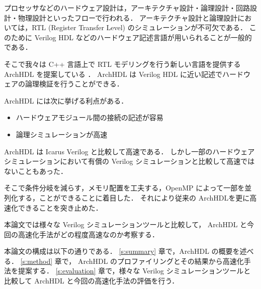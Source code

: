 プロセッサなどのハードウェア設計は，アーキテクチャ設計・論理設計・回路設計・物理設計といったフローで行われる．
アーキテクチャ設計と論理設計においては，RTL (Register Transfer Level) のシミュレーションが不可欠である．
このために Verilog HDL などのハードウェア記述言語が用いられることが一般的である．

そこで我々は C++ 言語上で RTL モデリングを行う新しい言語を提供する
ArchHDL を提案している \cite{satos:archhdl}． ArchHDL は Verilog HDL
に近い記述でハードウェアの論理検証を行うことができる．

ArchHDL には次に挙げる利点がある．

\begin{itemize}
\itemsep1pt\parskip0pt
\item
  ハードウェアモジュール間の接続の記述が容易
\item
  論理シミュレーションが高速
\end{itemize}

ArchHDL は Icarus Verilog \cite{iverilog}と比較して高速である．
しかし一部のハードウェアシミュレーションにおいて有償の Verilog
シミュレーションと比較して高速ではないこともあった．

そこで条件分岐を減らす，メモリ配置を工夫する，OpenMP によって一部を並列化する，ことができることに着目した．
それにより従来の ArchHDLを更に高速化できることを突き止めた．

本論文では様々な Verilog シミュレーションツールと比較して， ArchHDL と今回の高速化手法がどの程度高速なのか考察する．

本論文の構成は以下の通りである． \ref{s:summary} 章で，ArchHDL の概要を述べる．
\ref{s:method} 章で， ArchHDL のプロファイリングとその結果から高速化手法を提案する．
\ref{s:evaluation} 章で，様々な Verilog シミュレーションツールと比較して ArchHDL と今回の高速化手法の評価を行う．
